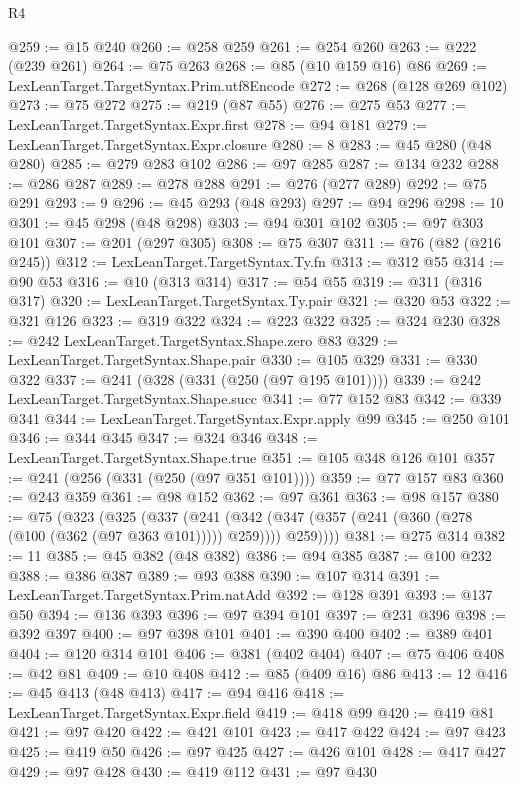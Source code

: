 \begin{lexlean}{R4}
\begin{coremodule}
@259 := @15 @240
@260 := @258 @259
@261 := @254 @260
@263 := @222 (@239 @261)
@264 := @75 @263
@268 := @85 (@10 @159 @16) @86
@269 := LexLeanTarget.TargetSyntax.Prim.utf8Encode
@272 := @268 (@128 @269 @102)
@273 := @75 @272
@275 := @219 (@87 @55)
@276 := @275 @53
@277 := LexLeanTarget.TargetSyntax.Expr.first
@278 := @94 @181
@279 := LexLeanTarget.TargetSyntax.Expr.closure
@280 := 8
@283 := @45 @280 (@48 @280)
@285 := @279 @283 @102
@286 := @97 @285
@287 := @134 @232
@288 := @286 @287
@289 := @278 @288
@291 := @276 (@277 @289)
@292 := @75 @291
@293 := 9
@296 := @45 @293 (@48 @293)
@297 := @94 @296
@298 := 10
@301 := @45 @298 (@48 @298)
@303 := @94 @301 @102
@305 := @97 @303 @101
@307 := @201 (@297 @305)
@308 := @75 @307
@311 := @76 (@82 (@216 @245))
@312 := LexLeanTarget.TargetSyntax.Ty.fn
@313 := @312 @55
@314 := @90 @53
@316 := @10 (@313 @314)
@317 := @54 @55
@319 := @311 (@316 @317)
@320 := LexLeanTarget.TargetSyntax.Ty.pair
@321 := @320 @53
@322 := @321 @126
@323 := @319 @322
@324 := @223 @322
@325 := @324 @230
@328 := @242 LexLeanTarget.TargetSyntax.Shape.zero @83
@329 := LexLeanTarget.TargetSyntax.Shape.pair
@330 := @105 @329
@331 := @330 @322
@337 := @241 (@328 (@331 (@250 (@97 @195 @101))))
@339 := @242 LexLeanTarget.TargetSyntax.Shape.succ
@341 := @77 @152 @83
@342 := @339 @341
@344 := LexLeanTarget.TargetSyntax.Expr.apply @99
@345 := @250 @101
@346 := @344 @345
@347 := @324 @346
@348 := LexLeanTarget.TargetSyntax.Shape.true
@351 := @105 @348 @126 @101
@357 := @241 (@256 (@331 (@250 (@97 @351 @101))))
@359 := @77 @157 @83
@360 := @243 @359
@361 := @98 @152
@362 := @97 @361
@363 := @98 @157
@380 := @75
    (@323
      (@325
        (@337
          (@241
            (@342 (@347 (@357 (@241 (@360 (@278 (@100 (@362 (@97 @363 @101))))) @259))))
            @259))))
@381 := @275 @314
@382 := 11
@385 := @45 @382 (@48 @382)
@386 := @94 @385
@387 := @100 @232
@388 := @386 @387
@389 := @93 @388
@390 := @107 @314
@391 := LexLeanTarget.TargetSyntax.Prim.natAdd
@392 := @128 @391
@393 := @137 @50
@394 := @136 @393
@396 := @97 @394 @101
@397 := @231 @396
@398 := @392 @397
@400 := @97 @398 @101
@401 := @390 @400
@402 := @389 @401
@404 := @120 @314 @101
@406 := @381 (@402 @404)
@407 := @75 @406
@408 := @42 @81
@409 := @10 @408
@412 := @85 (@409 @16) @86
@413 := 12
@416 := @45 @413 (@48 @413)
@417 := @94 @416
@418 := LexLeanTarget.TargetSyntax.Expr.field
@419 := @418 @99
@420 := @419 @81
@421 := @97 @420
@422 := @421 @101
@423 := @417 @422
@424 := @97 @423
@425 := @419 @50
@426 := @97 @425
@427 := @426 @101
@428 := @417 @427
@429 := @97 @428
@430 := @419 @112
@431 := @97 @430

\end{coremodule}
\end{lexlean}
